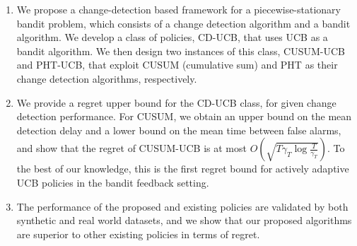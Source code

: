 \documentclass[letterpaper]{article} %
\begin{document}
\begin{enumerate}
 \item We propose a change-detection based framework for a piecewise-stationary bandit problem, which consists of a change detection algorithm and a bandit algorithm. We develop a class of policies, CD-UCB, that uses UCB as a bandit algorithm. We then design two instances of this class, CUSUM-UCB and PHT-UCB, that exploit CUSUM (cumulative sum) and PHT as their change detection algorithms, respectively.
 \item
We provide a regret upper bound for the CD-UCB class, for given change detection performance. For CUSUM, we obtain an upper bound on the mean detection delay and a lower bound on the mean time between false alarms, and show that the regret of CUSUM-UCB is at most $O(\sqrt{T\gamma_T\log{\frac{T}{\gamma_T}}})$. To the best of our knowledge, this is the first regret bound for actively adaptive UCB policies in the bandit feedback setting.
 \item
The performance of the proposed and existing policies are validated by both synthetic and real world datasets, and we show that our proposed algorithms are superior to other existing policies in terms of regret.
 \end{enumerate}
\end{document}
